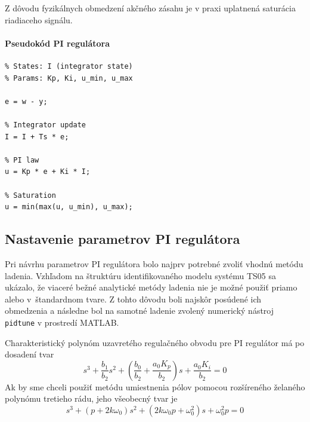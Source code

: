 Z dôvodu fyzikálnych obmedzení akčného zásahu
je v praxi uplatnená saturácia riadiaceho signálu.

\paragraph{Pseudokód PI regulátora}

\begin{lstlisting}[style=pseudocode,
caption={Pseudokód diskrétnej realizácie PI regulátora so saturáciou},
label={lst:pi_pseudocode}]
% Inputs: w (setpoint), y (output), Ts
% States: I (integrator state)
% Params: Kp, Ki, u_min, u_max

e = w - y;

% Integrator update
I = I + Ts * e;

% PI law
u = Kp * e + Ki * I;

% Saturation
u = min(max(u, u_min), u_max);
\end{lstlisting}


\subsection{Nastavenie parametrov PI regulátora}

Pri návrhu parametrov PI regulátora bolo najprv potrebné zvoliť vhodnú metódu ladenia.
Vzhľadom na štruktúru identifikovaného modelu systému TS05 sa ukázalo, že viaceré
bežné analytické metódy ladenia nie je možné použiť priamo alebo v~štandardnom tvare.
Z tohto dôvodu boli najskôr posúdené ich obmedzenia a následne bol na samotné ladenie
zvolený numerický nástroj \texttt{pidtune} v prostredí MATLAB.

Charakteristický polynóm uzavretého regulačného obvodu pre PI regulátor má po dosadení tvar
\begin{equation}
	s^3 
	+ \frac{b_1}{b_2} s^2 
	+ \left( \frac{b_0}{b_2} + \frac{a_0 K_p}{b_2} \right) s 
	+ \frac{a_0 K_i}{b_2} 
	= 0
	\label{eq:cl_poly_real}
\end{equation}
Ak by sme chceli použiť metódu umiestnenia pólov pomocou rozšíreného želaného polynómu tretieho rádu, jeho všeobecný tvar je
\begin{equation}
	s^3 + (p + 2 k \omega_0) s^2 + (2 k \omega_0 p + \omega_0^2) s + \omega_0^2 p = 0
	\label{eq:desired_poly}
\end{equation}

